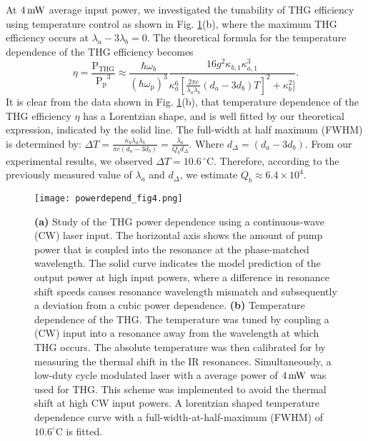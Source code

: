 \documentclass[9pt,twocolumn,twoside]{optica}
\begin{document}
At $4\thinspace\mathrm{mW}$ average input power, we investigated the tunability of THG efficiency using temperature control as shown in Fig. \ref{fig:powerdepend}(b), where the maximum THG efficiency occurs at $\lambda_{a}-3\lambda_{b}=0$. The theoretical formula for the temperature dependence of the THG efficiency becomes
%
\begin{equation}
\eta =\frac{\mathrm{P_{THG}}}{\mathrm{P_{p}}^3} \approx \frac{\hbar\omega_{b}}{(\hbar\omega_{\mathrm{p}})^{3}} \frac{16g^{2}\kappa_{b,1}\kappa_{a,1}^3}{\kappa_{a}^6 [\frac{2\pi c}{\lambda_{a}\lambda_{b}}(d_a-3d_b)T]^{2}+\kappa_{b}^{2}]}.
\label{eq:thgpower2}
\end{equation}
It is clear from the data shown in Fig. \ref{fig:powerdepend}(b), that temperature dependence of the THG efficiency $\eta$ has a Lorentzian shape, and is well fitted by our theoretical expression, indicated by the solid line. The full-width at half maximum (FWHM) is determined by: $\Delta T=\frac{\kappa_{b}\lambda_{a}\lambda_{b}}{\pi c(d_a-3d_b)}=\frac{\lambda_{a}}{Q_{b}d_{\Delta}}$. Where $d_{\Delta} = (d_a-3d_b)$. From our experimental results, we observed $\Delta T=10.6\,\mathrm{^{\circ}C}$. Therefore, according to the previously measured value of $\lambda_{a}$ and $d_{\Delta}$, we estimate $Q_{b}\approx6.4\times10^{4}$. 
\begin{figure}[ht]
\centering
\texttt{[image: powerdepend\_fig4.png]}
\caption{\textbf{(a)} Study of the THG power dependence using a continuous-wave (CW) laser input. The horizontal axis shows the amount of pump power that is coupled into the resonance at the phase-matched wavelength. The solid curve indicates the model prediction of the output power at high input powers, where a difference in resonance shift speeds causes resonance wavelength mismatch and subsequently a deviation from a cubic power dependence.  \textbf{(b)} Temperature dependence of the THG. The temperature was tuned by coupling a (CW) input into a resonance away from the wavelength at which THG occurs. The absolute temperature was then calibrated for by measuring the thermal shift in the IR resonances. Simultaneously, a low-duty cycle modulated laser with a average power of $4\thinspace\mathrm{mW}$ was used for THG. This scheme was implemented to avoid the thermal shift at high CW input powers.  A lorentzian shaped temperature dependence curve with a full-width-at-half-maximum (FWHM) of $10.6^{\circ}\mathrm{C}$ is fitted.}
\label{fig:powerdepend}
\end{figure}
%
\end{document}
